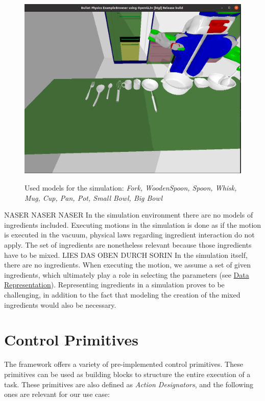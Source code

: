 \begin{figure}[H]
    \includegraphics[scale=0.35]{Graphics/toolscontainersmodels.png}
    \label{fig:toolscontainersmodels}
    \caption{Used models for the simulation: \textit{Fork, WoodenSpoon, Spoon, Whisk, Mug, Cup, Pan, Pot, Small Bowl, Big Bowl}}
\end{figure}
NASER NASER NASER
In the simulation environment there are no models of ingredients included. Executing motions in the simulation is done as if the motion is executed in 
the vacuum, physical laws regarding ingredient interaction do not apply. The set of ingredients are nonetheless relevant because those ingredients have to be mixed.
LIES DAS OBEN DURCH SORIN
In the simulation itself, there are no ingredients. When executing the motion, we assume a set of given ingredients, which ultimately play a role in selecting the parameters (see \hyperref[chap:Data_representation]{Data Representation}). Representing ingredients in a simulation proves to be challenging, in addition to the fact that modeling the creation of the mixed ingredients would also be necessary.
\section{Control Primitives}
The framework  \cite{pycram} offers a variety of pre-implemented control primitives. These primitives can be used as building blocks to structure the entire execution of a task. These primitives are also defined as \textit{Action Designators}, and the following ones are relevant for our use case:

